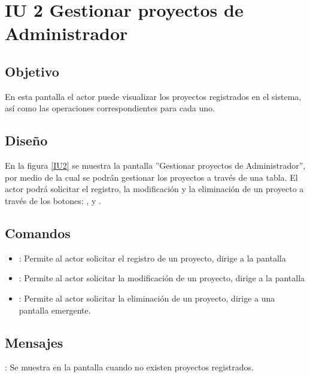 \section{IU 2 Gestionar proyectos de Administrador}

\subsection{Objetivo}
	En esta pantalla el actor puede visualizar los proyectos registrados en el sistema, así como las operaciones correspondientes para cada uno.

\subsection{Diseño}
	En la figura \ref{IU2} se muestra la pantalla ''Gestionar proyectos de Administrador'', por medio de la cual se podrán gestionar los proyectos a través de una tabla. El actor podrá solicitar el registro, la modificación y la eliminación de un proyecto a través de los botones: , \editar y \eliminar.

\label{IU2}
\subsection{Comandos}
\begin{itemize}
	\item {}: Permite al actor solicitar el registro de un proyecto, dirige a la pantalla 
	\item \editar [Modificar]: Permite al actor solicitar la modificación de un proyecto, dirige a la pantalla 
	\item \eliminar [Eliminar]: Permite al actor solicitar la eliminación de un proyecto, dirige a una pantalla emergente.
\end{itemize}

\subsection{Mensajes}

\begin{Citemize}
	\item {}: Se muestra en la pantalla  cuando no existen proyectos registrados.
\end{Citemize}

